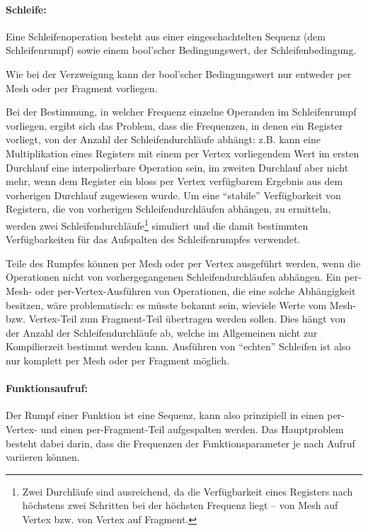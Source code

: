 \documentclass[twoside,a4paper,fleqn,12pt]{book}
\begin{document}
\paragraph{Schleife:} Eine Schleifenoperation besteht aus einer eingeschachtelten Sequenz (dem Schleifenrumpf) sowie
einem bool'scher Bedingungswert, der Schleifenbedingung.

Wie bei der Verzweigung kann der bool'scher Bedingungswert nur entweder per Mesh oder per Fragment vorliegen.

Bei der Bestimmung, in welcher Frequenz einzelne Operanden im Schleifenrumpf vorliegen,
ergibt sich das Problem, dass die Frequenzen, in denen ein Register vorliegt, von der Anzahl der Schleifendurchläufe
abhängt: z.B. kann eine Multiplikation eines Registers mit einem per Vertex vorliegendem Wert im ersten Durchlauf
eine interpolierbare Operation sein, im zweiten Durchlauf aber nicht mehr, wenn dem Register ein bloss per Vertex
verfügbarem Ergebnis aus dem vorherigen Durchlauf zugewiesen wurde.
Um eine "`stabile"' Verfügbarkeit von Registern, die von vorherigen Schleifendurchläufen abhängen, zu ermitteln,
werden zwei Schleifendurchläufe\footnote{Zwei Durchläufe sind ausreichend, da die Verfügbarkeit eines Registers
nach höchstens zwei Schritten bei der höchsten Frequenz liegt -- von Mesh auf Vertex bzw. von Vertex auf Fragment.}
simuliert und die damit bestimmten Verfügbarkeiten für das Aufspalten des Schleifenrumpfes verwendet.

Teile des Rumpfes können per Mesh oder per Vertex ausgeführt werden, wenn die Operationen nicht von vorhergegangenen Schleifendurchläufen
abhängen. Ein per-Mesh- oder per-Vertex-Ausführen von Operationen, die eine solche Abhängigkeit besitzen, wäre problematisch: es müsste bekannt sein, wieviele Werte vom
Mesh- bzw. Vertex-Teil zum Fragment-Teil übertragen werden sollen. Dies hängt von der Anzahl der Schleifendurchläufe ab,
welche im Allgemeinen nicht zur Kompilierzeit bestimmt werden kann.
Ausführen von "`echten"' Schleifen ist also nur komplett per Mesh oder per Fragment möglich.

\paragraph{Funktionsaufruf:} Der Rumpf einer Funktion ist eine Sequenz, kann also prinzipiell in einen per-Vertex- und einen per-Fragment-Teil aufgespalten werden.
Das Hauptproblem besteht dabei darin, dass die Frequenzen der Funktionsparameter je nach Aufruf variieren können.
\end{document}

